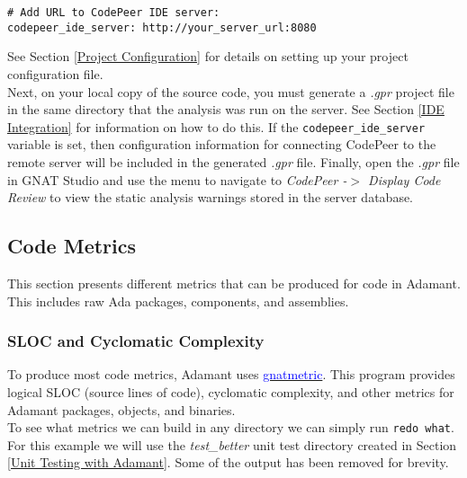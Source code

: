 \vspace{5mm} %
\begin{verbatim}
# Add URL to CodePeer IDE server:
codepeer_ide_server: http://your_server_url:8080
\end{verbatim}
\vspace{5mm} %

See Section \ref{Project Configuration} for details on setting up your project configuration file. \\

Next, on your local copy of the source code, you must generate a \textit{.gpr} project file in the same directory that the analysis was run on the server. See Section \ref{IDE Integration} for information on how to do this. If the \texttt{codepeer\_ide\_server} variable is set, then configuration information for connecting CodePeer to the remote server will be included in the generated \textit{.gpr} file. Finally, open the \textit{.gpr} file in GNAT Studio and use the menu to navigate to \textit{CodePeer -$>$ Display Code Review} to view the static analysis warnings stored in the server database.

\subsection{Code Metrics} \label{Code Metrics}

This section presents different metrics that can be produced for code in Adamant. This includes raw Ada packages, components, and assemblies.

\subsubsection{SLOC and Cyclomatic Complexity}

To produce most code metrics, Adamant uses \href{https://gcc.gnu.org/onlinedocs/gcc-4.8.4/gnat_ugn/The-GNAT-Metric-Tool-gnatmetric.html}{\textcolor{blue}{gnatmetric}}. This program provides logical SLOC (source lines of code), cyclomatic complexity, and other metrics for Adamant packages, objects, and binaries. \\

To see what metrics we can build in any directory we can simply run \texttt{redo what}. For this example we will use the \textit{test\_better} unit test directory created in Section \ref{Unit Testing with Adamant}. Some of the output has been removed for brevity.

